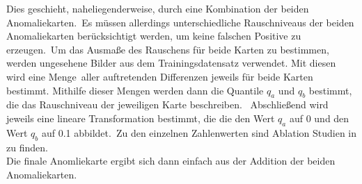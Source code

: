 Dies geschieht, naheliegenderweise, durch eine Kombination der beiden Anomaliekarten.\ 
Es müssen allerdings unterschiedliche Rauschniveaus der beiden Anomaliekarten berücksichtigt werden, um keine falschen Positive zu erzeugen.\
Um das Ausmaße des Rauschens für beide Karten zu bestimmen, werden ungesehene Bilder aus dem Trainingsdatensatz verwendet. Mit diesen wird eine Menge\
aller auftretenden Differenzen jeweils für beide Karten bestimmt. Mithilfe dieser Mengen werden dann die Quantile $q_{a}$ und $q_{b}$ bestimmt, die das Rauschniveau der jeweiligen Karte beschreiben. \
Abschließend wird jeweils eine lineare Transformation bestimmt, die die den Wert $q_{a}$ auf 0 und den Wert $q_{b}$ auf \num{0,1} abbildet.\
Zu den einzelnen Zahlenwerten sind Ablation Studien in \cite{efficientad} zu finden.\\
Die finale Anomliekarte ergibt sich dann einfach aus der Addition der beiden Anomaliekarten.  
